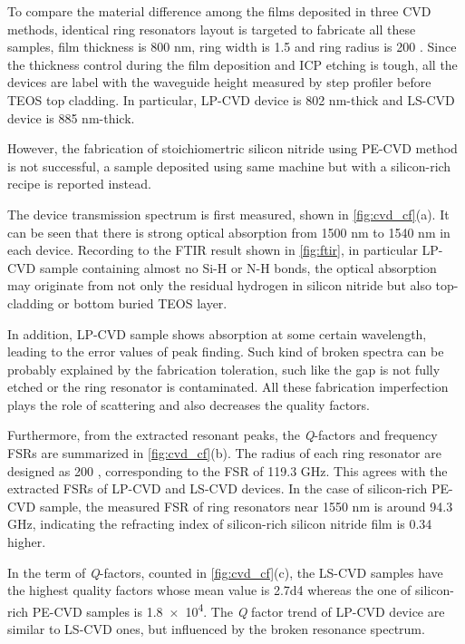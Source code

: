 To compare the material difference among the films deposited in three CVD methods, identical ring resonators layout is targeted to fabricate all these samples, film thickness is 800 nm, ring width is 1.5 \um and ring radius is 200 \um. %
Since the thickness control during the film deposition and ICP etching is tough, all the devices are label with the waveguide height measured by step profiler before TEOS top cladding. In particular, LP-CVD device is 802 nm-thick and LS-CVD device is 885 nm-thick.

However, the fabrication of stoichiomertric silicon nitride using PE-CVD method is not successful, a sample deposited using same machine but with a silicon-rich recipe is reported instead. 

The device transmission spectrum is first measured, shown in \autoref{fig:cvd_cf}(a). It can be seen that there is strong optical absorption from 1500 nm to 1540 nm in each device. 
Recording to the FTIR result shown in \autoref{fig:ftir}, in particular LP-CVD sample containing almost no Si-H or N-H bonds, 
the optical absorption may originate from not only the residual hydrogen in silicon nitride but also top-cladding or bottom buried TEOS layer. 

In addition, LP-CVD sample shows absorption at some certain wavelength, leading to the error values of peak finding. Such kind of broken spectra can be probably explained by the fabrication toleration, such like the gap is not fully etched or the ring resonator is contaminated. All these fabrication imperfection plays the role of scattering and also decreases the quality factors.

Furthermore, from the extracted resonant peaks, the \textit{Q}-factors and frequency FSRs are summarized in \autoref{fig:cvd_cf}(b). The radius of each ring resonator are designed as 200 \um, corresponding to the FSR of 119.3 GHz. This agrees with the extracted FSRs of LP-CVD and LS-CVD devices. In the case of silicon-rich PE-CVD sample, the measured FSR of ring resonators near 1550 nm is around 94.3 GHz, indicating the refracting index of silicon-rich silicon nitride film is 0.34 higher.

In the term of \textit{Q}-factors, counted in \autoref{fig:cvd_cf}(c), the LS-CVD samples have the highest quality factors whose mean value is \num{2.7d4} whereas the one of silicon-rich PE-CVD samples is \num{1.8e4}. The \textit{Q} factor trend of LP-CVD device are similar to LS-CVD ones, but influenced by the broken resonance spectrum.

